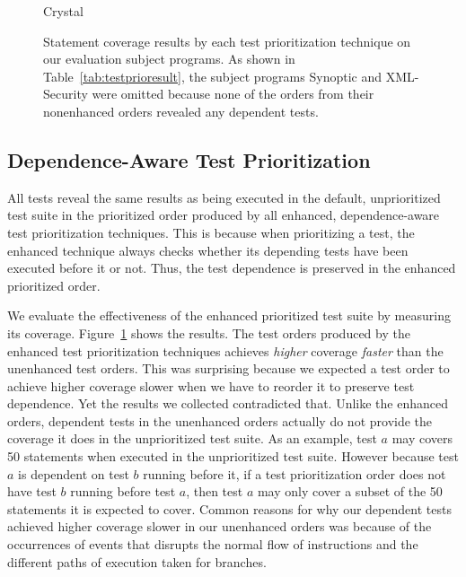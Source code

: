 \begin{figure}[t]
\begin{minipage}[b]{\linewidth}
{Crystal}
\end{minipage}
\vspace{-6mm}
\caption{
    \label{fig:priocoverage}
Statement coverage results by each test prioritization technique on
our evaluation subject programs.
As shown in Table~\ref{tab:testprioresult}, the subject programs Synoptic
and XML-Security were omitted because none of the orders from their
nonenhanced orders revealed any dependent tests.
}
\end{figure}




\subsection{Dependence-Aware Test Prioritization}

All tests reveal the same results as being executed
in the default, unprioritized test suite in the prioritized
order produced by all enhanced, dependence-aware test
prioritization techniques. This is because when prioritizing
a test, the enhanced technique always checks whether
its depending tests have been executed before it or not. Thus,
the test dependence is preserved in the enhanced prioritized order.

We evaluate the effectiveness of the enhanced prioritized test suite
by measuring its coverage. Figure~\ref{fig:priocoverage}
shows the results. The test orders produced by the enhanced
test prioritization techniques achieves \textit{higher}
coverage \textit{faster} than the unenhanced test orders.
This was surprising because we expected a test order to achieve higher
coverage slower when we have to reorder it to preserve test dependence.
Yet the results we collected contradicted that.
Unlike the enhanced orders, dependent tests in the unenhanced orders
actually do not provide the coverage it does in the unprioritized test suite.
As an example, test $\mathit{a}$ may covers 50 statements when
executed in the unprioritized test suite. However because test
$\mathit{a}$ is dependent on test $\mathit{b}$ running before it,
if a test prioritization order does not have test $\mathit{b}$
running before test $\mathit{a}$, then test $\mathit{a}$ may only
cover a subset of the 50 statements it is expected to cover.
Common reasons for why our dependent tests achieved higher
coverage slower in our unenhanced orders was because of the
occurrences of events that disrupts the normal flow of
instructions and the different paths of execution taken for branches. 

